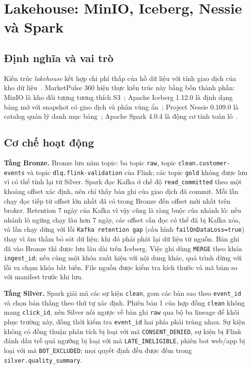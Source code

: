 \section{Lakehouse: MinIO, Iceberg, Nessie và Spark}
\label{sec:c3-lakehouse}

\subsection{Định nghĩa và vai trò}
\label{sec:c3-lakehouse-dinh-nghia}
Kiến trúc \emph{lakehouse} kết hợp chi phí thấp của hồ dữ liệu với tính giao dịch của kho dữ liệu~\cite{armbrust2021lakehouse}. MarketPulse 360 hiện thực kiến trúc này bằng bốn thành phần: MinIO là kho đối tượng tương thích S3~\cite{minio}; Apache Iceberg 1.12.0 là định dạng bảng mở với snapshot có giao dịch và phân vùng ẩn~\cite{icebergspec}; Project Nessie 0.109.0 là catalog quản lý danh mục bảng~\cite{nessie}; Apache Spark 4.0.4 là động cơ tính toán lô~\cite{zaharia2012rdd, sparkdocs}.

\subsection{Cơ chế hoạt động}
\label{sec:c3-lakehouse-co-che}
\textbf{Tầng Bronze.} Bronze lưu năm topic: ba topic \texttt{raw}, topic \texttt{clean.customer-events} và topic \texttt{dlq.flink-validation} của Flink; các topic \texttt{gold} không được lưu vì có thể tính lại từ Silver. Spark đọc Kafka ở chế độ \texttt{read\_committed} theo một khoảng offset xác định, nên chỉ thấy bản ghi của giao dịch đã commit. Mỗi lần chạy đọc tiếp từ offset lớn nhất đã có trong Bronze đến offset mới nhất trên broker. Retention 7 ngày của Kafka vì vậy cũng là ràng buộc của nhánh lô: nếu nhánh lô ngừng chạy lâu hơn 7 ngày, các offset cần đọc có thể đã bị Kafka xóa, và lần chạy dừng với lỗi \texttt{Kafka retention gap} (cấu hình \texttt{failOnDataLoss=true}) thay vì âm thầm bỏ sót dữ liệu; khi đó phải phát lại dữ liệu từ nguồn. Bản ghi đã vào Bronze thì được lưu lâu dài trên Iceberg. Việc ghi dùng \texttt{MERGE} theo khóa \texttt{ingest\_id}; nếu cùng một khóa xuất hiện với nội dung khác, quá trình dừng với lỗi va chạm khóa bất biến. File nguồn được kiểm tra kích thước và mã băm so với manifest trước khi lưu.

\textbf{Tầng Silver.} Spark giải mã các sự kiện \texttt{clean}, gom các bản sao theo \texttt{event\_id} và chọn bản thắng theo thứ tự xác định. Phiên bản 1 của hợp đồng \texttt{clean} không mang \texttt{click\_id}, nên Silver nối ngược về bản ghi \texttt{raw} qua bộ ba lineage để khôi phục trường này, đồng thời kiểm tra \texttt{event\_id} hai phía phải trùng nhau. Sự kiện không có đồng thuận phân tích bị loại với mã \texttt{CONSENT\_DENIED}, sự kiện bị Flink đánh dấu trễ quá ngưỡng bị loại với mã \texttt{LATE\_INELIGIBLE}, phiên bot web/app bị loại với mã \texttt{BOT\_EXCLUDED}; mọi quyết định đều được đếm trong \texttt{silver.quality\_summary}.

